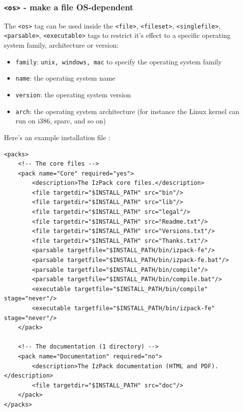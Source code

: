 \subsubsection{\label{tag:os}\texttt{<os>} - make a file OS-dependent}

The \texttt{<os>} tag can be used inside the \texttt{<file>},
\texttt{<fileset>}, \texttt{<singlefile>}, \texttt{<parsable>},
\texttt{<executable>} tags to restrict it's effect to a specific
operating system family, architecture or version:

\begin{itemize}

  \item \texttt{family}: \texttt{unix, windows, mac} to specify the
  operating system family
  \item \texttt{name}: the operating system name
  \item \texttt{version}: the operating system version
  \item \texttt{arch}: the operating system architecture (for instance the
  Linux kernel can run on i386, sparc, and so on)

\end{itemize}


Here's an example installation file :
\footnotesize
\begin{verbatim}
<packs>
    <!-- The core files -->
    <pack name="Core" required="yes">
        <description>The IzPack core files.</description>
        <file targetdir="$INSTALL_PATH" src="bin"/>
        <file targetdir="$INSTALL_PATH" src="lib"/>
        <file targetdir="$INSTALL_PATH" src="legal"/>
        <file targetdir="$INSTALL_PATH" src="Readme.txt"/>
        <file targetdir="$INSTALL_PATH" src="Versions.txt"/>
        <file targetdir="$INSTALL_PATH" src="Thanks.txt"/>
        <parsable targetfile="$INSTALL_PATH/bin/izpack-fe"/>
        <parsable targetfile="$INSTALL_PATH/bin/izpack-fe.bat"/>
        <parsable targetfile="$INSTALL_PATH/bin/compile"/>
        <parsable targetfile="$INSTALL_PATH/bin/compile.bat"/>
        <executable targetfile="$INSTALL_PATH/bin/compile" stage="never"/>
        <executable targetfile="$INSTALL_PATH/bin/izpack-fe" stage="never"/>
    </pack>
    
    <!-- The documentation (1 directory) -->
    <pack name="Documentation" required="no">
        <description>The IzPack documentation (HTML and PDF).</description>
        <file targetdir="$INSTALL_PATH" src="doc"/>
    </pack>
</packs>
\end{verbatim}
\normalsize

